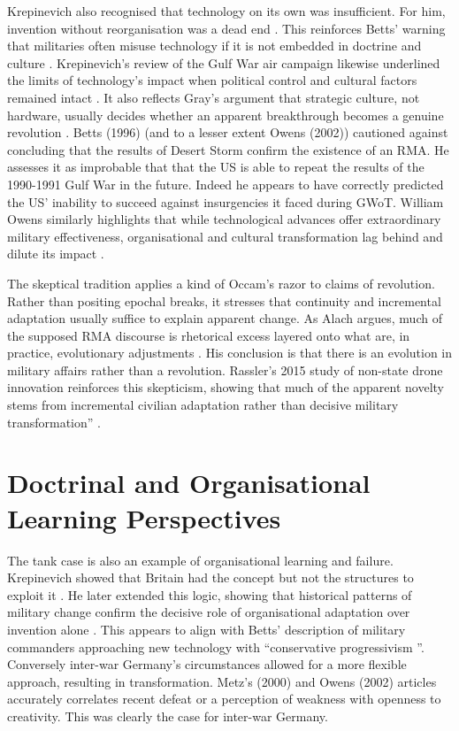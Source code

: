 Krepinevich also recognised that technology on its own was insufficient. For him, invention without reorganisation was a dead end \parencite{KREP_1992}. This reinforces Betts’ warning that militaries often misuse technology if it is not embedded in doctrine and culture \parencite{BETTS_1996}. Krepinevich’s review of the Gulf War air campaign likewise underlined the limits of technology’s impact when political control and cultural factors remained intact \parencite{KREP_1996}. It also reflects Gray’s argument that strategic culture, not hardware, usually decides whether an apparent breakthrough becomes a genuine revolution \parencite{GRAY_2005}. Betts (1996) (and to a lesser extent Owens (2002)\nocite{OWENS_2002}) cautioned against concluding that the results of Desert Storm confirm the existence of an RMA. He assesses it as improbable that that the US is able to repeat the results of the 1990-1991 Gulf War in the future. Indeed he appears to have correctly predicted the US' inability to succeed against insurgencies it faced during GWoT. William Owens  similarly highlights that while technological advances offer extraordinary military effectiveness, organisational and cultural transformation lag behind and dilute its impact \parencite{OWENS_2002}. 

The skeptical tradition applies a kind of Occam’s razor to claims of revolution. Rather than positing epochal breaks, it stresses that continuity and incremental adaptation usually suffice to explain apparent change. As Alach argues, much of the supposed RMA discourse is rhetorical excess layered onto what are, in practice, evolutionary adjustments \parencite[.p~50-52]{ALACH_2008}. His conclusion is that there is an evolution in military affairs rather than a revolution. Rassler’s 2015 study of non-state drone innovation reinforces this skepticism, showing that much of the apparent novelty stems from incremental civilian adaptation rather than decisive military transformation”  \parencite{RASSLER_2015}.

\section{Doctrinal and Organisational Learning Perspectives}

The tank case is also an example of organisational learning and failure. Krepinevich showed that Britain had the concept but not the structures to exploit it \parencite{KREPINEVICH_1992}. He later extended this logic, showing that historical patterns of military change confirm the decisive role of organisational adaptation over invention alone \parencite{KREP_1994}. This appears to align with Betts' description of military commanders approaching new technology with ``conservative progressivism  ''\parencite{BETTS_1996}.  Conversely inter-war Germany's circumstances allowed for a more flexible approach, resulting in transformation. Metz's (2000) and Owens (2002) articles accurately correlates recent defeat or a perception of weakness with openness to creativity\nocite{METZ_2000,OWENS_2002}. This was clearly the case for inter-war Germany.



